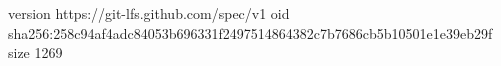 version https://git-lfs.github.com/spec/v1
oid sha256:258c94af4adc84053b696331f2497514864382c7b7686cb5b10501e1e39eb29f
size 1269
